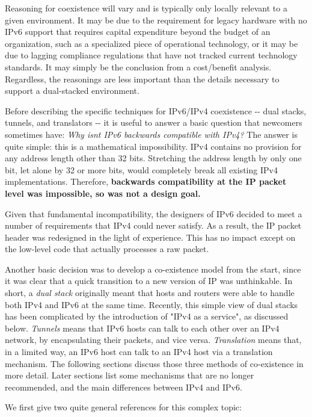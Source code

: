 \documentclass[
]{article}
\begin{document}
Reasoning for coexistence will vary and is typically only locally
relevant to a given environment. It may be due to the requirement for
legacy hardware with no IPv6 support that requires capital expenditure
beyond the budget of an organization, such as a specialized piece of
operational technology, or it may be due to lagging compliance
regulations that have not tracked current technology standards. It may
simply be the conclusion from a cost/benefit analysis. Regardless, the
reasonings are less important than the details necessary to support a
dual-stacked environment.

Before describing the specific techniques for IPv6/IPv4 coexistence -\/-
dual stacks, tunnels, and translators -\/- it is useful to answer a
basic question that newcomers sometimes have: \emph{Why
isn\textquotesingle t IPv6 backwards compatible with IPv4?} The answer
is quite simple: this is a mathematical impossibility. IPv4 contains no
provision for any address length other than 32 bits. Stretching the
address length by only one bit, let alone by 32 or more bits, would
completely break all existing IPv4 implementations. Therefore,
\textbf{backwards compatibility at the IP packet level was impossible,
so was not a design goal.}

Given that fundamental incompatibility, the designers of IPv6 decided to
meet a number of requirements that IPv4 could never satisfy. As a
result, the IP packet header was redesigned in the light of experience.
This has no impact except on the low-level code that actually processes
a raw packet.

Another basic decision was to develop a co-existence model from the
start, since it was clear that a quick transition to a new version of IP
was unthinkable. In short, a \emph{dual stack} originally meant that
hosts and routers were able to handle both IPv4 and IPv6 at the same
time. Recently, this simple view of dual stacks has been complicated by
the introduction of "IPv4 as a service", as discussed below.
\emph{Tunnels} means that IPv6 hosts can talk to each other over an IPv4
network, by encapsulating their packets, and vice versa.
\emph{Translation} means that, in a limited way, an IPv6 host can talk
to an IPv4 host via a translation mechanism. The following sections
discuss those three methods of co-existence in more detail. Later
sections list some mechanisms that are no longer recommended, and the
main differences between IPv4 and IPv6.

We first give two quite general references for this complex topic:
\end{document}
